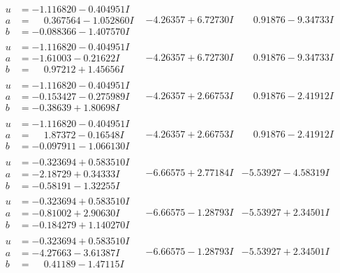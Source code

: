 \documentclass[1p]{elsarticle_modified}
\theoremstyle{definition}
\begin{document}
$$\begin{array}{c|c|c}
\begin{aligned}
u &= -1.116820 - 0.404951 I \\
a &= \phantom{-}0.367564 - 1.052860 I \\
b &= -0.088366 - 1.407570 I\end{aligned}
 & -4.26357 + 6.72730 I & \phantom{-}0.91876 - 9.34733 I \\ \hline\begin{aligned}
u &= -1.116820 - 0.404951 I \\
a &= -1.61003 - 0.21622 I \\
b &= \phantom{-}0.97212 + 1.45656 I\end{aligned}
 & -4.26357 + 6.72730 I & \phantom{-}0.91876 - 9.34733 I \\ \hline\begin{aligned}
u &= -1.116820 - 0.404951 I \\
a &= -0.153427 - 0.275989 I \\
b &= -0.38639 + 1.80698 I\end{aligned}
 & -4.26357 + 2.66753 I & \phantom{-}0.91876 - 2.41912 I \\ \hline\begin{aligned}
u &= -1.116820 - 0.404951 I \\
a &= \phantom{-}1.87372 - 0.16548 I \\
b &= -0.097911 - 1.066130 I\end{aligned}
 & -4.26357 + 2.66753 I & \phantom{-}0.91876 - 2.41912 I \\ \hline\begin{aligned}
u &= -0.323694 + 0.583510 I \\
a &= -2.18729 + 0.34333 I \\
b &= -0.58191 - 1.32255 I\end{aligned}
 & -6.66575 + 2.77184 I & -5.53927 - 4.58319 I \\ \hline\begin{aligned}
u &= -0.323694 + 0.583510 I \\
a &= -0.81002 + 2.90630 I \\
b &= -0.184279 + 1.140270 I\end{aligned}
 & -6.66575 - 1.28793 I & -5.53927 + 2.34501 I \\ \hline\begin{aligned}
u &= -0.323694 + 0.583510 I \\
a &= -4.27663 - 3.61387 I \\
b &= \phantom{-}0.41189 - 1.47115 I\end{aligned}
 & -6.66575 - 1.28793 I & -5.53927 + 2.34501 I \\ \hline\begin{aligned}

\end{aligned}
\end{array}$$
\end{document}
